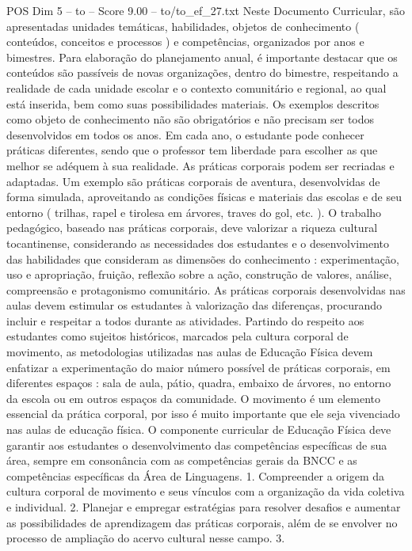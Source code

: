 \begin{textsample}{POS Dim 5 – to – Score 9.00 – to/to\_ef\_27.txt}
Neste Documento Curricular, são apresentadas unidades temáticas, habilidades, objetos de conhecimento ( conteúdos, conceitos e processos ) e competências, organizados por anos e bimestres.
Para elaboração do planejamento anual, é importante destacar que os conteúdos são passíveis de novas organizações, dentro do bimestre, respeitando a realidade de cada unidade escolar e o contexto comunitário e regional, ao qual está inserida, bem como suas possibilidades materiais.
Os exemplos descritos como objeto de conhecimento não são obrigatórios e não precisam ser todos desenvolvidos em todos os anos.
Em cada ano, o estudante pode conhecer práticas diferentes, sendo que o professor tem liberdade para escolher as que melhor se adéquem à sua realidade.
As práticas corporais podem ser recriadas e adaptadas.
Um exemplo são práticas corporais de aventura, desenvolvidas de forma simulada, aproveitando as condições físicas e materiais das escolas e de seu entorno ( trilhas, rapel e tirolesa em árvores, traves do gol, etc. ).
O trabalho pedagógico, baseado nas práticas corporais, deve valorizar a riqueza cultural tocantinense, considerando as necessidades dos estudantes e o desenvolvimento das habilidades que consideram as dimensões do conhecimento : experimentação, uso e apropriação, fruição, reflexão sobre a ação, construção de valores, análise, compreensão e protagonismo comunitário.
As práticas corporais desenvolvidas nas aulas devem estimular os estudantes à valorização das diferenças, procurando incluir e respeitar a todos durante as atividades.
Partindo do respeito aos estudantes como sujeitos históricos, marcados pela cultura corporal de movimento, as metodologias utilizadas nas aulas de Educação Física devem enfatizar a experimentação do maior número possível de práticas corporais, em diferentes espaços : sala de aula, pátio, quadra, embaixo de árvores, no entorno da escola ou em outros espaços da comunidade.
O movimento é um elemento essencial da prática corporal, por isso é muito importante que ele seja vivenciado nas aulas de educação física.
O componente curricular de Educação Física deve garantir aos estudantes o desenvolvimento das competências específicas de sua área, sempre em consonância com as competências gerais da BNCC e as competências específicas da Área de Linguagens. 1.
Compreender a origem da cultura corporal de movimento e seus vínculos com a organização da vida coletiva e individual. 2.
Planejar e empregar estratégias para resolver desafios e aumentar as possibilidades de aprendizagem das práticas corporais, além de se envolver no processo de ampliação do acervo cultural nesse campo. 3.

\end{textsample}
